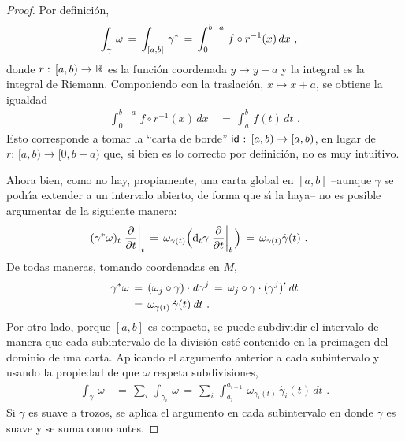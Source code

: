\begin{proof}
	Por definici\'{o}n,
	\begin{align*}
		\int_{\gamma}\,\omega & \,=\,\int_{[a,b]}\,{\gamma}^{*}\,=\,
			\int_{0}^{b-a}\,f\circ r^{-1}(x)\,dx
		\text{ ,}
	\end{align*}
	donde $r:\,[a,b)\rightarrow\mathbb{R}$ es la funci\'{o}n coordenada
	$y\mapsto y-a$ y la integral es la integral de Riemann.
	Componiendo con la traslaci\'{o}n, $x\mapsto x+a$, se obtiene
	la igualdad
	\begin{align*}
		\int_{0}^{b-a}\,f\circ r^{-1}(x)\,dx & \,=\,
			\int_{a}^{b}\,f(t)\,dt
		\text{ .}
	\end{align*}
	Esto corresponde a tomar la ``carta de borde''
	$\mathsf{id}_{}:\,[a,b)\rightarrow[a,b)$, en lugar de
	$r:\,[a,b)\rightarrow[0,b-a)$ que, si bien es lo correcto por
	definici\'{o}n, no es muy intuitivo.

	Ahora bien, como no hay, propiamente, una carta global en
	$[a,b]$ --aunque $\gamma$ se podr\'{\i}a extender a un intervalo
	abierto, de forma que s\'{\i} la haya-- no es posible argumentar de
	la siguiente manera:
	\begin{align*}
		(\pull{\gamma}\omega)_{t}\gancho[t]{t} & \,=\,
			\omega_{\gamma(t)}\Big(\diferencial[t]{\gamma}
				\gancho[t]{t}\Big) \,=\,
			\omega_{\gamma(t)}\dot{\gamma}(t)
		\text{ .}
	\end{align*}
	De todas maneras, tomando coordenadas en $M$,
	\begin{align*}
		{\gamma}^{*}\omega & \,=\,(\omega_{j}\circ\gamma)\cdot
			\mathit{d}_{}{\gamma^{j}} \,=\,\omega_{j}\circ\gamma\cdot
			(\gamma^{j})'\,\mathit{d}_{}{t} \\
		& \,=\,\omega_{\gamma(t)}\,\dot{\gamma}(t)\,\mathit{d}_{}{t}
		\text{ .}
	\end{align*}
	Por otro lado, porque $[a,b]$ es compacto, se puede subdividir el
	intervalo de manera que cada subintervalo de la divisi\'{o}n est\'{e}
	contenido en la preimagen del dominio de una carta. Aplicando el
	argumento anterior a cada subintervalo y usando la propiedad
	de que $\omega$ respeta subdivisiones,
	\begin{align*}
		\int_{\gamma}\,\omega & \,=\,\sum_{i}\,
			\int_{\gamma_{i}}\,\omega \,=\,\sum_{i}\,
			\int_{a_{i}}^{a_{i+1}}\,\omega_{\gamma_{i}(t)}\,
				\dot{\gamma_{i}}(t)\,dt
		\text{ .}
	\end{align*}
	Si $\gamma$ es suave a trozos, se aplica el argumento en cada
	subintervalo en donde $\gamma$ es suave y se suma como antes.
\end{proof}

